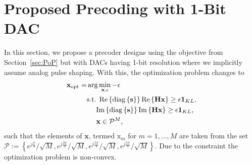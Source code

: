 \documentclass[journal,comsoc]{IEEEtran}
\begin{document}
\section{Proposed Precoding with 1-Bit DAC}
\label{sec:BB_precoding}
In this section, we propose a precoder designs using the objective from Section~\ref{sec:PoP} but with DACs having 1-bit resolution where we implicitly assume analog pulse shaping. With this, the optimization problem changes to
\begin{align}
\label{eq:optimization_problem_precoder}
\mathbf{x}_{\textrm{opt}} = &  \arg\min_{\mathbf{x}, \epsilon}  -\epsilon \\
& \textrm{s.t. }     \mathrm{Re} \left\{   \mathrm{diag} \left\{ \mathbf{s} \right\}  \right\}    \mathrm{Re} \left\{ \mathbf{H} \mathbf{x}  \right\}   \geq  \epsilon \boldsymbol{1}_{K L} \textrm{,} \notag \\
& \ \ \ \          \mathrm{Im} \left\{   \mathrm{diag} \left\{ \mathbf{s} \right\}  \right\}    \mathrm{Im} \left\{ \mathbf{H} \mathbf{x}  \right\}   \geq  \epsilon \boldsymbol{1}_{K L} \textrm{,} \notag \\
& \ \ \ \      \mathbf{x} \in \mathcal{P}^M \textrm{,}   \notag 
\end{align}
such that the elements of $\mathbf{x}$, termed $\mathrm{x}_m$ for $m=1,\ldots,M$ are taken from the set \newline $\mathcal{P}:= \left\{   e^{j \frac{\pi}{4}}/ \sqrt{M}, e^{j \frac{ 3\pi}{ 4 }}/ \sqrt{M}, e^{j \frac{ 5\pi}{ 4 }}/ \sqrt{M}, e^{j \frac{ 7\pi}{ 4 }}/ \sqrt{M}     \right\}$. Due to the constraint the optimization problem is non-convex.
\end{document}
